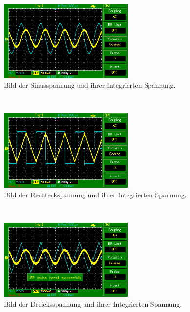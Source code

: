 \begin{figure}[h]
    \centering
    \includegraphics[width=0.6\textwidth]{MAP007.png}
    \caption{Bild der Sinusspannung und ihrer Integrierten Spannung.}
    \label{abb:sinus}
\end{figure}\\
\begin{figure}[h]
    \centering
    \includegraphics[width=0.6\textwidth]{MAP006.png}
    \caption{Bild der Rechteckspannung und ihrer Integrierten Spannung.}
    \label{abb:rechteck}
\end{figure}\\
\begin{figure}[h]
    \centering
    \includegraphics[width=0.6\textwidth]{MAP005.png}
    \caption{Bild der Dreicksspannung und ihrer Integrierten Spannung.}
    \label{abb:dreieck}
\end{figure}\\
